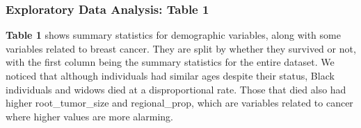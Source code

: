\documentclass[
]{article}
\begin{document}
\hypertarget{exploratory-data-analysis-table-1}{%
\subsubsection{Exploratory Data Analysis: Table
1}\label{exploratory-data-analysis-table-1}}

\textbf{Table 1} shows summary statistics for demographic variables,
along with some variables related to breast cancer. They are split by
whether they survived or not, with the first column being the summary
statistics for the entire dataset. We noticed that although individuals
had similar ages despite their status, Black individuals and widows died
at a disproportional rate. Those that died also had higher
root\_tumor\_size and regional\_prop, which are variables related to
cancer where higher values are more alarming.
\end{document}
